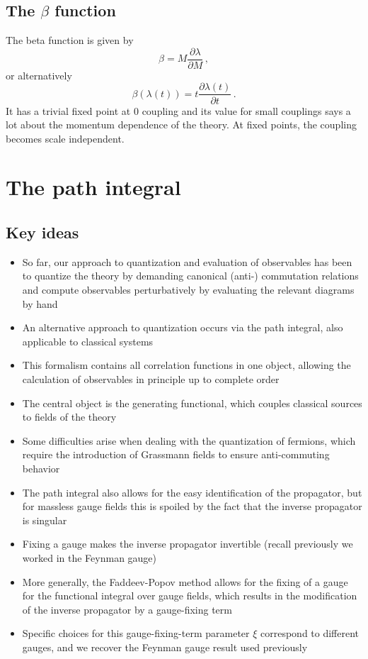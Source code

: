 \documentclass[12pt]{memoir}
\begin{document}
\section{The $\beta$ function}

The beta function is given by
\begin{equation}
  \beta = M \frac{\partial \lambda}{\partial M}\,,
\end{equation}
or alternatively
\begin{equation}
  \beta(\lambda(t)) = t \frac{\partial \lambda(t)}{\partial t}\,.
\end{equation}
It has a trivial fixed point at 0 coupling
and its value for small couplings says a lot about the momentum dependence of the theory.
At fixed points, the coupling becomes scale independent.

\chapter{The path integral}

\section{Key ideas}

\begin{itemize}
  \item So far, our approach to quantization and evaluation of observables has been
    to quantize the theory by demanding canonical (anti-) commutation relations
    and compute observables perturbatively by evaluating the relevant diagrams by hand
  \item An alternative approach to quantization occurs via the path integral,
    also applicable to classical systems
  \item This formalism contains all correlation functions in one object,
    allowing the calculation of observables in principle up to complete order
  \item The central object is the generating functional,
    which couples classical sources to fields of the theory
  \item Some difficulties arise when dealing with the quantization of fermions,
    which require the introduction of Grassmann fields to ensure anti-commuting behavior
  \item The path integral also allows for the easy identification of the propagator,
    but for massless gauge fields this is spoiled by the fact that the inverse propagator is singular
  \item Fixing a gauge makes the inverse propagator invertible (recall previously we worked in the Feynman gauge)
  \item More generally, the Faddeev-Popov method allows for the fixing of a gauge
    for the functional integral over gauge fields,
    which results in the modification of the inverse propagator by a gauge-fixing term
  \item Specific choices for this gauge-fixing-term parameter $\xi$ correspond to different gauges,
    and we recover the Feynman gauge result used previously
\end{itemize}
\end{document}

